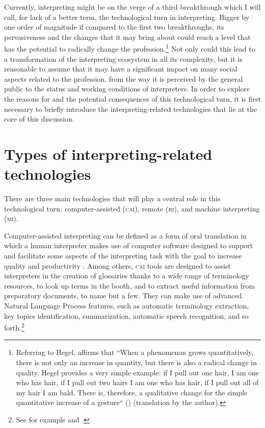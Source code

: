 \documentclass[output=paper]{langsci/langscibook}
\begin{document}
Currently, interpreting might be on the verge of a third breakthrough which I will call, for lack of a better term, the technological turn in interpreting. Bigger by one order of magnitude if compared to the first two breakthroughs, its pervasiveness and the changes that it may bring about could reach a level that has the potential to radically change the profession.\footnote{Referring to Hegel, \citeauthor{galimberti_i_2009} affirms that “When a phenomenon grows quantitatively, there is not only an increase in quantity, but there is also a radical change in quality. Hegel provides a very simple example: if I pull out one hair, I am one who has hair, if I pull out two hairs I am one who has hair, if I pull out all of my hair I am bald. There is, therefore, a qualitative change for the simple quantitative increase of a gesture“ (\citeyear{galimberti_i_2009}) (translation by the author).} Not only could this lead to a transformation of the interpreting ecosystem in all its complexity, but it is reasonable to assume that it may have a significant impact on many social aspects related to the profession, from the way it is perceived by the general public to the status and working conditions of interpreters. In order to explore the reasons for and the potential consequences of this technological turn, it is first necessary to briefly introduce the interpreting-related technologies that lie at the core of this discussion. 
 
\section{Types of interpreting-related technologies} 
There are three main technologies that will play a central role in this technological turn: computer-assisted (\textsc{cai}), remote (\textsc{ri}), and machine interpreting (\textsc{mi}). 
 
Computer-assisted interpreting can be defined as a form of oral translation in which a human interpreter makes use of computer software designed to support and facilitate some aspects of the interpreting task with the goal to increase quality and productivity \citep{Fantinuoli2018}. Among others, \textsc{cai} tools are designed to assist interpreters in the creation of glossaries thanks to a wide range of terminology resources, to look up terms in the booth, and to extract useful information from preparatory documents, to name but a few. They can make use of advanced Natural Language Process features, such as automatic terminology extraction, key topics identification, summarization, automatic speech recognition, and so forth.\footnote{See for example
\citet{Fantinuoli2017b}
and \citet{stewart_automatic_2018}.} 
 
\end{document}
